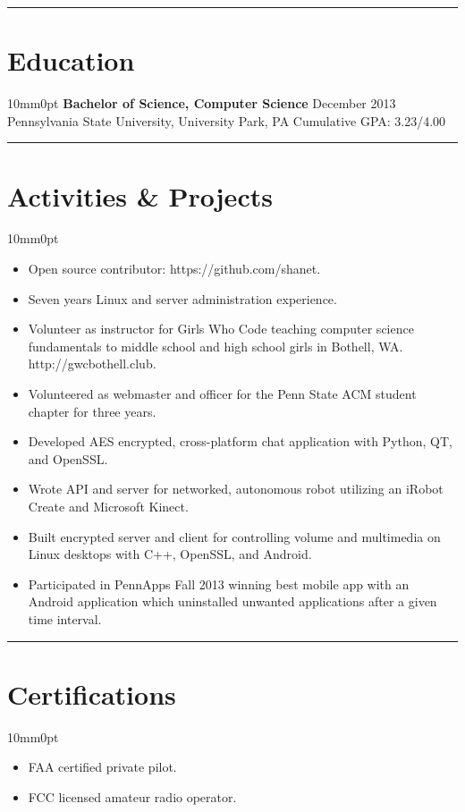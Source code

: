 \documentclass[letterpaper]{article}
\newcommand{\sectionrule}[1] {
  \noindent\rule{\textwidth}{.1mm}
  \vspace{-11mm}
  \section{#1}
}
\newenvironment{indentsection}
  {\begin{adjustwidth}{10mm}{0pt}}
  {\end{adjustwidth}}
\begin{document}
  \sectionrule{Education}

  \begin{indentsection}
    \textbf{Bachelor of Science, Computer Science} \hfill December 2013\\
    Pennsylvania State University, University Park, PA \hfill Cumulative GPA: 3.23/4.00
  \end{indentsection}

  \sectionrule{Activities \& Projects}

  \begin{indentsection}
    \begin{itemize}
      \item Open source contributor: https://github.com/shanet.
      \item Seven years Linux and server administration experience.
      \item Volunteer as instructor for Girls Who Code teaching computer science fundamentals to middle school and high school girls in Bothell, WA. http://gwcbothell.club.
      \item Volunteered as webmaster and officer for the Penn State ACM student chapter for three years.
      \item Developed AES encrypted, cross-platform chat application with Python, QT, and OpenSSL.
      \item Wrote API and server for networked, autonomous robot utilizing an iRobot Create and Microsoft Kinect.
      \item Built encrypted server and client for controlling volume and multimedia on Linux desktops with C++, OpenSSL, and Android.
      \item Participated in PennApps Fall 2013 winning best mobile app with an Android application which uninstalled unwanted applications after a given time interval.
    \end{itemize}
  \end{indentsection}

  \sectionrule{Certifications}

  \begin{indentsection}
    \begin{itemize}
      \item FAA certified private pilot.
      \item FCC licensed amateur radio operator.
    \end{itemize}
  \end{indentsection}
\end{document}
